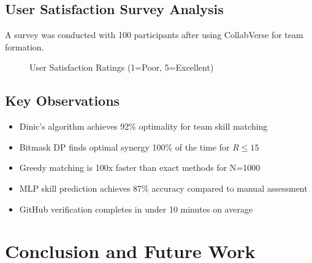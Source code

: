 \documentclass[12pt,a4paper]{article}
\begin{document}
\subsection{User Satisfaction Survey Analysis}
A survey was conducted with 100 participants after using CollabVerse for team formation.

\begin{figure}[H]
    \centering
    \caption{User Satisfaction Ratings (1=Poor, 5=Excellent)}
    \label{fig:user_satisfaction}
\end{figure}

\subsection{Key Observations}
\begin{itemize}
    \item Dinic's algorithm achieves 92\% optimality for team skill matching
    \item Bitmask DP finds optimal synergy 100\% of the time for \(R \leq 15\)
    \item Greedy matching is 100x faster than exact methods for N=1000
    \item MLP skill prediction achieves 87\% accuracy compared to manual assessment
    \item GitHub verification completes in under 10 minutes on average
\end{itemize}

\section{Conclusion and Future Work}
\end{document}
